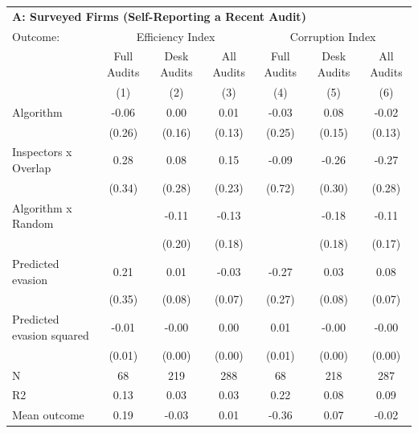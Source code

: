 \begin{tabular}{lccc|ccc} \toprule
\multicolumn{7}{l}{\textbf{A: Surveyed Firms (Self-Reporting a Recent Audit)}} \\ \multicolumn{1}{l}{Outcome:} & \multicolumn{3}{c}{Efficiency Index} & \multicolumn{3}{c}{Corruption Index} \\ \multicolumn{1}{l}{} & Full Audits & Desk Audits & All Audits & Full Audits & Desk Audits & All Audits \\ \multicolumn{1}{l}{} & (1) & (2) & (3) & (4) & (5) & (6) \\ \midrule
Algorithm   &       -0.06         &        0.00         &        0.01         &       -0.03         &        0.08         &       -0.02         \\
            &      (0.26)         &      (0.16)         &      (0.13)         &      (0.25)         &      (0.15)         &      (0.13)         \\
\addlinespace
Inspectors x Overlap&        0.28         &        0.08         &        0.15         &       -0.09         &       -0.26         &       -0.27         \\
            &      (0.34)         &      (0.28)         &      (0.23)         &      (0.72)         &      (0.30)         &      (0.28)         \\
\addlinespace
Algorithm x Random&                     &       -0.11         &       -0.13         &                     &       -0.18         &       -0.11         \\
            &                     &      (0.20)         &      (0.18)         &                     &      (0.18)         &      (0.17)         \\
\addlinespace
Predicted evasion&        0.21         &        0.01         &       -0.03         &       -0.27         &        0.03         &        0.08         \\
            &      (0.35)         &      (0.08)         &      (0.07)         &      (0.27)         &      (0.08)         &      (0.07)         \\
\addlinespace
Predicted evasion squared&       -0.01         &       -0.00         &        0.00         &        0.01         &       -0.00         &       -0.00         \\
            &      (0.01)         &      (0.00)         &      (0.00)         &      (0.01)         &      (0.00)         &      (0.00)         \\
\midrule
N           &          68         &         219         &         288         &          68         &         218         &         287         \\
R2          &        0.13         &        0.03         &        0.03         &        0.22         &        0.08         &        0.09         \\
Mean outcome&        0.19         &       -0.03         &        0.01         &       -0.36         &        0.07         &       -0.02         \\


\end{tabular}
